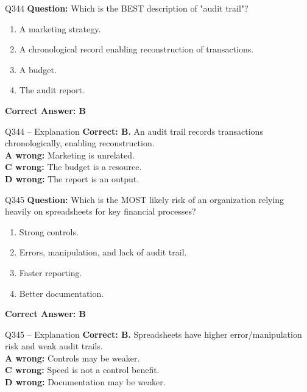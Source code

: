 \documentclass[aspectratio=169,10pt]{beamer}
\begin{document}
	\begin{frame}[t]{Q344}
		\small
		\textbf{Question:} Which is the BEST description of "audit trail"?
		\begin{enumerate}[label=\Alph*.,itemsep=1pt,topsep=2pt]
			\item A marketing strategy.
			\item A chronological record enabling reconstruction of transactions.
			\item A budget.
			\item The audit report.
		\end{enumerate}
		\vspace{4pt}
		\textbf{Correct Answer: B}
	\end{frame}
	
	\begin{frame}[t]{Q344 -- Explanation}
		\small
		\textbf{Correct: B.} An audit trail records transactions chronologically, enabling reconstruction. \\[4pt]
		\textbf{A wrong:} Marketing is unrelated. \\[2pt]
		\textbf{C wrong:} The budget is a resource. \\[2pt]
		\textbf{D wrong:} The report is an output.
	\end{frame}
	
	\begin{frame}[t]{Q345}
		\small
		\textbf{Question:} Which is the MOST likely risk of an organization relying heavily on spreadsheets for key financial processes?
		\begin{enumerate}[label=\Alph*.,itemsep=1pt,topsep=2pt]
			\item Strong controls.
			\item Errors, manipulation, and lack of audit trail.
			\item Faster reporting.
			\item Better documentation.
		\end{enumerate}
		\vspace{4pt}
		\textbf{Correct Answer: B}
	\end{frame}
	
	\begin{frame}[t]{Q345 -- Explanation}
		\small
		\textbf{Correct: B.} Spreadsheets have higher error/manipulation risk and weak audit trails. \\[4pt]
		\textbf{A wrong:} Controls may be weaker. \\[2pt]
		\textbf{C wrong:} Speed is not a control benefit. \\[2pt]
		\textbf{D wrong:} Documentation may be weaker.
	\end{frame}
	
\end{document}
